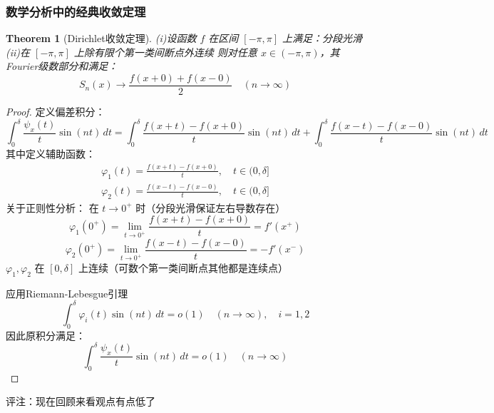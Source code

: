\documentclass[linespread=1.5,openany]{book}%
\theoremstyle{plain}
\newtheorem{theorem}{Theorem}
\begin{document}
{{{					\subsubsection{数学分析中的经典收敛定理}{
						\begin{theorem}[Dirichlet收敛定理]
							(i)设函数 $f$ 在区间 $[-\pi, \pi]$ 上满足：分段光滑\\
							(ii)在 $[-\pi, \pi]$ 上除有限个第一类间断点外连续
							则对任意 $x \in (-\pi, \pi)$，其Fourier级数部分和满足：
							\[	S_n(x) \to \frac{f(x+0) + f(x-0)}{2} \quad (n \to \infty)	\]
						\end{theorem}
						\begin{proof}{
								定义偏差积分：
								\[
								\int_0^\delta \frac{\psi_x(t)}{t} \sin(nt) \, dt = \int_0^\delta \frac{f(x+t)-f(x+0)}{t} \sin(nt) \, dt + \int_0^\delta \frac{f(x-t)-f(x-0)}{t} \sin(nt) \, dt
								\]
								其中定义辅助函数：
								\[
								\begin{aligned}
									\varphi_1(t) = \frac{f(x+t)-f(x+0)}{t}, \quad t \in (0, \delta] \\
									\varphi_2(t) = \frac{f(x-t)-f(x-0)}{t}, \quad t \in (0, \delta]
								\end{aligned}
								\] 
								关于正则性分析：
								在 $t \to 0^+$ 时（分段光滑保证左右导数存在）
								\[\varphi_1(0^+) = \lim_{t \to 0^+} \frac{f(x+t)-f(x+0)}{t} = f'(x^+)\]
								\[\varphi_2(0^+) = \lim_{t \to 0^+} \frac{f(x-t)-f(x-0)}{t} = -f'(x^-)\]
								$\varphi_1, \varphi_2$ 在 $[0, \delta]$ 上连续（可数个第一类间断点其他都是连续点）
								
								
								应用Riemann-Lebesgue引理
								\[\int_0^\delta \varphi_i(t) \sin(nt) \, dt = o(1) \quad (n \to \infty),\quad i=1,2\]
								因此原积分满足：
								\[\int_0^\delta \frac{\psi_x(t)}{t} \sin(nt) \, dt = o(1) \quad (n \to \infty)\]
						}\end{proof}
						评注：现在回顾来看观点有点低了
					}
				}
			}
		}
\end{document}
